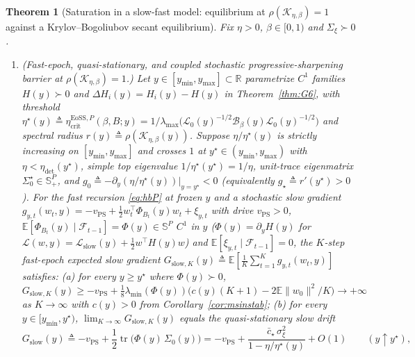 \documentclass[11pt]{article}
\newtheorem{theorem}{Theorem}
\theoremstyle{remark}
\newcommand{\etacrit}{\eta_{\mathrm{crit}}}
\newcommand{\E}{\mathbb{E}}
\newcommand{\R}{\mathbb{R}}
\newcommand{\tr}{\operatorname{tr}}
\begin{document}
\begin{theorem}[Saturation in a slow-fast model: equilibrium at $\rho(\mathcal K_{\eta,\beta})=1$ against a Krylov--Bogoliubov secant equilibrium]\label{thm:slow-fast-saturation}
Fix $\eta>0$, $\beta\in[0,1)$ and $\Sigma_\xi\succ0$.
\begin{enumerate}
\item \emph{(Fast-epoch, quasi-stationary, and coupled stochastic progressive-sharpening barrier at $\rho(\mathcal K_{\eta,\beta})=1$.)} Let $y\in[y_{\min},y_{\max}]\subset\R$ parametrize $C^1$ families $H(y)\succ0$ and $\Delta H_i(y)=H_i(y)-H(y)$ in Theorem~\ref{thm:G6}, with threshold $\eta^\star(y)\triangleq\etacrit^{\mathrm{EoSS},P}(\beta,B;y)=1/\lambda_{\max}\big(\mathcal L_0(y)^{-1/2}\mathcal B_\beta(y)\mathcal L_0(y)^{-1/2}\big)$ and spectral radius $r(y)\triangleq\rho(\mathcal K_{\eta,\beta}(y))$. Suppose $\eta/\eta^\star(y)$ is strictly increasing on $[y_{\min},y_{\max}]$ and crosses $1$ at $y^\star\in(y_{\min},y_{\max})$ with $\eta<\eta_{\mathrm{det}}(y^\star)$, simple top eigenvalue $1/\eta^\star(y^\star)=1/\eta$, unit-trace eigenmatrix $\Sigma_0^\star\in\mathbb S_+^P$, and $g_0\triangleq-\partial_y(\eta/\eta^\star(y))\big|_{y=y^\star}<0$ (equivalently $g_\star\triangleq r'(y^\star)>0$). For the fast recursion \eqref{eq:hbP} at frozen $y$ and a stochastic slow gradient $g_{y,t}(w_t,y)=-v_{\mathrm{PS}}+\frac12w_t^\top\Phi_{B_t}(y)w_t+\xi_{y,t}$ with drive $v_{\mathrm{PS}}>0$, $\E[\Phi_{B_t}(y)\mid\mathcal F_{t-1}]=\Phi(y)\in\mathbb S^P$ $C^1$ in $y$ ($\Phi(y)=\partial_yH(y)$ for $\mathcal L(w,y)=\mathcal L_{\mathrm{slow}}(y)+\frac12w^\top H(y)w$) and $\E[\xi_{y,t}\mid\mathcal F_{t-1}]=0$, the $K$-step fast-epoch expected slow gradient $G_{\mathrm{slow},K}(y)\triangleq\E[\frac1K\sum_{t=1}^Kg_{y,t}(w_t,y)]$ satisfies:
(a) for every $y\ge y^\star$ where $\Phi(y)\succ0$, $G_{\mathrm{slow},K}(y)\ge -v_{\mathrm{PS}}+\frac18\lambda_{\min}(\Phi(y))\big(c(y)(K+1)-2\E\|w_0\|^2/K\big)\to+\infty$ as $K\to\infty$ with $c(y)>0$ from Corollary~\ref{cor:msinstab};
(b) for every $y\in[y_{\min},y^\star)$, $\lim_{K\to\infty}G_{\mathrm{slow},K}(y)$ equals the quasi-stationary slow drift
\begin{equation}\label{eq:slow-drift}
G_{\mathrm{slow}}(y)\triangleq -v_{\mathrm{PS}}+\frac12\tr\big(\Phi(y)\,\Sigma_0(y)\big)=-v_{\mathrm{PS}}+\frac{\bar c_\star\,\sigma_\xi^2}{1-\eta/\eta^\star(y)}+O(1)\qquad(y\uparrow y^\star),
\end{equation}

\end{enumerate}
\end{theorem}
\end{document}
